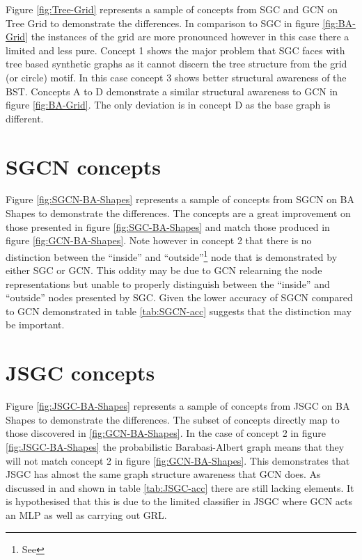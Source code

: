 Figure \ref{fig:Tree-Grid} represents a sample of concepts from SGC and GCN on Tree Grid to demonstrate the differences.
In comparison to SGC in figure \ref{fig:BA-Grid} the instances of the grid are more pronounced however in this case there a limited and less pure.
Concept 1 shows the major problem that SGC faces with tree based synthetic graphs as it cannot discern the tree structure from the grid (or circle) motif.
In this case concept 3 shows better structural awareness of the BST.
Concepts A to D demonstrate a similar structural awareness to GCN in figure \ref{fig:BA-Grid}.
The only deviation is in concept D as the base graph is different.

\section{SGCN concepts}


Figure \ref{fig:SGCN-BA-Shapes} represents a sample of concepts from SGCN on BA Shapes to demonstrate the differences.
The concepts are a great improvement on those presented in figure \ref{fig:SGC-BA-Shapes} and match those produced in figure \ref{fig:GCN-BA-Shapes}.
Note however in concept 2 that there is no distinction between the ``inside'' and ``outside''\footnote{See \Sref{}} node that is demonstrated by either SGC or GCN.
This oddity may be due to GCN relearning the node representations but unable to properly distinguish between the ``inside'' and ``outside'' nodes presented by SGC.
Given the lower accuracy of SGCN compared to GCN demonstrated in table \ref{tab:SGCN-acc} suggests that the distinction may be important.

\section{JSGC concepts}


Figure \ref{fig:JSGC-BA-Shapes} represents a sample of concepts from JSGC on BA Shapes to demonstrate the differences.
The subset of concepts directly map to those discovered in \ref{fig:GCN-BA-Shapes}.
In the case of concept 2 in figure \ref{fig:JSGC-BA-Shapes} the probabilistic Barabasi-Albert graph means that they will not match concept 2 in figure \ref{fig:GCN-BA-Shapes}.
This demonstrates that JSGC has almost the same graph structure awareness that GCN does.
As discussed in  and shown in table \ref{tab:JSGC-acc} there are still lacking elements.
It is hypothesised that this is due to the limited classifier in JSGC where GCN acts an MLP as well as carrying out GRL.
